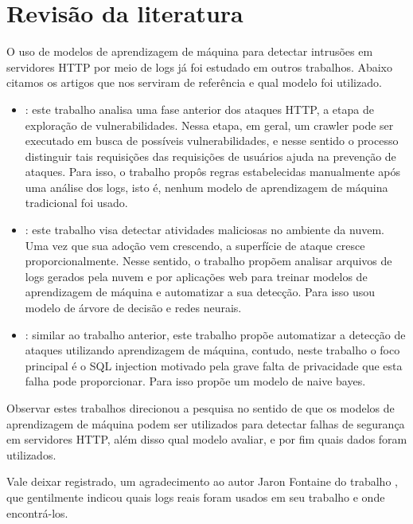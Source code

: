 
\chapter{Revisão da literatura}
\label{cap:fundamentation}

O uso de modelos de aprendizagem de máquina para detectar intrusões em servidores HTTP 
por meio de logs já foi estudado em outros trabalhos. Abaixo citamos os artigos que nos
serviram de referência e qual modelo foi utilizado.

\begin{itemize}
    \item \cite{ref:art3}: este trabalho analisa uma fase anterior dos ataques HTTP, a etapa
    de exploração de vulnerabilidades. Nessa etapa, em geral, um crawler pode ser executado 
    em busca de possíveis vulnerabilidades, e nesse sentido o processo distinguir tais 
    requisições das requisições de usuários ajuda na prevenção de ataques. Para isso, o 
    trabalho propôs regras estabelecidas manualmente após uma análise dos logs, isto é, 
    nenhum modelo de aprendizagem de máquina tradicional foi usado.

    \item \cite{ref:art6}: este trabalho visa detectar atividades maliciosas no ambiente 
    da nuvem. Uma vez que sua adoção vem crescendo, a superfície de ataque cresce proporcionalmente.
    Nesse sentido, o trabalho propõem analisar arquivos de logs gerados pela nuvem e por aplicações
    web para treinar modelos de aprendizagem de máquina e automatizar a sua detecção. Para isso
    usou modelo de árvore de decisão e redes neurais.

    \item \cite{ref:art2}: similar ao trabalho anterior, este trabalho propõe automatizar
    a detecção de ataques utilizando aprendizagem de máquina, contudo, neste trabalho
    o foco principal é o SQL injection motivado pela grave falta de privacidade 
    que esta falha pode proporcionar. Para isso propõe um modelo de naive bayes.
\end{itemize}

Observar estes trabalhos direcionou a pesquisa no sentido de que os modelos de 
aprendizagem de máquina podem ser utilizados para detectar falhas de segurança
em servidores HTTP, além disso qual modelo avaliar, e por fim quais dados foram utilizados.

Vale deixar registrado, um agradecimento ao autor Jaron Fontaine do trabalho \cite{ref:art6}, que gentilmente
indicou quais logs reais foram usados em seu trabalho e onde encontrá-los.